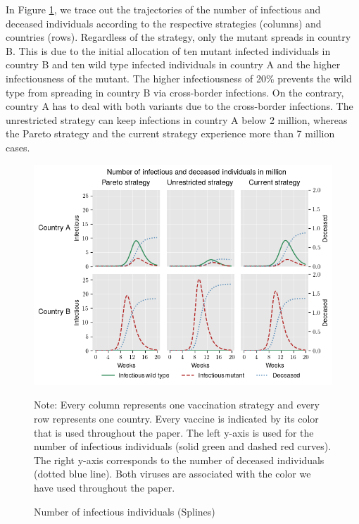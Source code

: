 In Figure \ref{fig:results_splines_infectious_dead}, we trace out the trajectories of the number of infectious and deceased individuals according to the respective strategies (columns) and countries (rows). Regardless of the strategy, only the mutant spreads in country B. This is due to the initial allocation of ten mutant infected individuals in country B and ten wild type infected individuals in country A and the higher infectiousness of the mutant. The higher infectiousness of 20\% prevents the wild type from spreading in country B via cross-border infections. On the contrary, country A has to deal with both variants due to the cross-border infections. The unrestricted strategy can keep infections in country A below 2 million, whereas the Pareto strategy and the current strategy experience more than 7 million cases. 


\begin{figure}[h!]
\centering
\includegraphics[scale=0.85]{images/splines_infectious_dead.png}
\begin{flushleft}
\scriptsize{Note:} Every column represents one vaccination strategy and every row represents one country. Every vaccine is indicated by its color that is used throughout the paper. The left y-axis is used for the number of infectious individuals (solid green and dashed red curves). The right y-axis corresponds to the number of deceased individuals (dotted blue line). Both viruses are associated with the color we have used throughout the paper. 
\end{flushleft}
\caption{Number of infectious individuals (Splines)}
\label{fig:results_splines_infectious_dead}
\end{figure}




